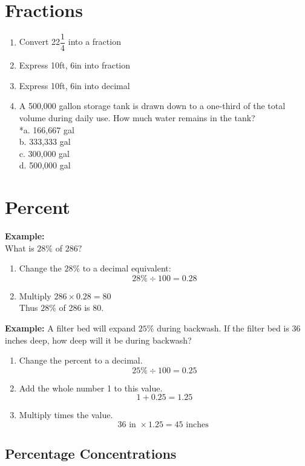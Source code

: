 \documentclass{article}
\begin{document}
\section{Fractions}
\begin{enumerate}
\item Convert 22$\dfrac{1}{4}$ into a fraction
\item Express 10ft, 6in into fraction
\item Express 10ft, 6in into decimal
\item A 500,000 gallon storage tank is drawn down to a one-third of the total volume during daily use. How much water remains in the tank?\\
*a.	166,667 gal\\
b.	333,333 gal\\
c.	300,000 gal\\
d.	500,000 gal
\end{enumerate}

\section{Percent}
\textbf{Example:}\\
What is $28 \%$ of $286 ?$\\

\begin{enumerate}[Step 1.]
\item Change the $28 \%$ to a decimal equivalent:  $$28 \% \div 100=0.28$$
\item Multiply $286 \times 0.28=80$\\
Thus $28 \%$ of 286 is 80.
\end{enumerate}

\textbf{Example:} A filter bed will expand $25 \%$ during backwash. If the filter bed is 36 inches deep, how deep will it be during backwash?\\

\begin{enumerate}[Step 1.]
\item Change the percent to a decimal.
$$
25 \% \div 100=0.25
$$
\item Add the whole number 1 to this value.
$$
1+0.25=1.25
$$
\item Multiply times the value.
$$
36 \text { in } \times 1.25=45 \text { inches }
$$
\end{enumerate}


\subsection{Percentage Concentrations}
\end{document}
